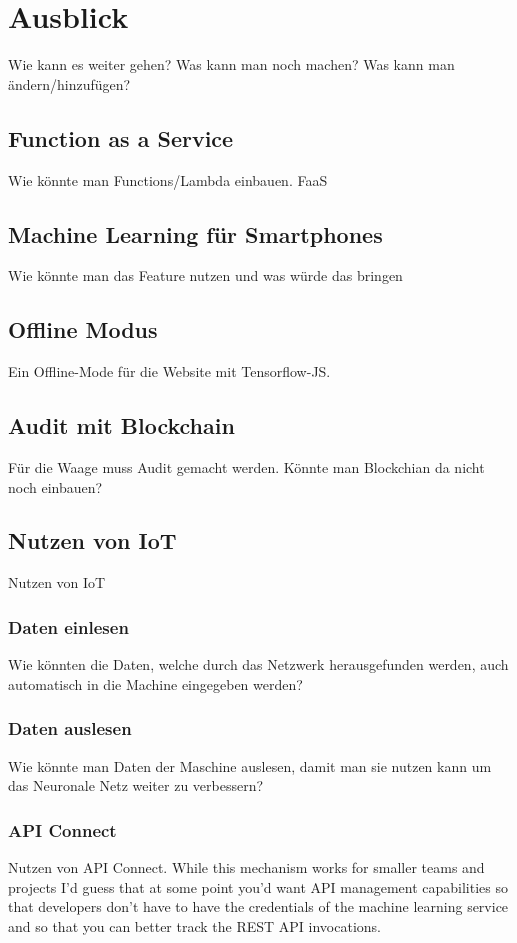 \chapter{Ausblick}
\label{ch:ausblick}
Wie kann es weiter gehen? Was kann man noch machen? Was kann man ändern/hinzufügen?

\section{Function as a Service}
Wie könnte man Functions/Lambda einbauen. FaaS

\section{Machine Learning für Smartphones}
Wie könnte man das Feature nutzen und was würde das bringen

\section{Offline Modus}
Ein Offline-Mode für die Website mit Tensorflow-JS.

\section{Audit mit Blockchain}
Für die Waage muss Audit gemacht werden. Könnte man Blockchian da nicht noch einbauen?

\section{Nutzen von IoT}
Nutzen von IoT

\subsection{Daten einlesen}
Wie könnten die Daten, welche durch das Netzwerk herausgefunden werden, auch automatisch in die Machine eingegeben werden?

\subsection{Daten auslesen}
Wie könnte man Daten der Maschine auslesen, damit man sie nutzen kann um das Neuronale Netz weiter zu verbessern?

\subsection{API Connect}
Nutzen von API Connect.
While this mechanism works for smaller teams and projects I’d guess that at some point you’d want API management
capabilities so that developers don’t have to have the credentials of the machine learning service and so that you can
better track the REST API invocations.